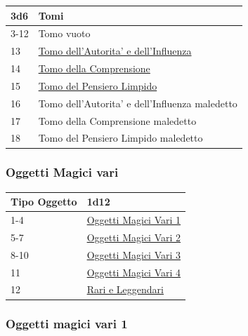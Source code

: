\begin{multicols}{2}
{\medskip\hypertarget{Tomi}{}

{\small\begin{tabularx}{\linewidth}{ll}
		\toprule
\textbf{3d6} & \textbf{Tomi}\\
\toprule
3-12 & Tomo vuoto\\
13 & \hyperlink{Tomo dell'Autorita' e dell'Influenza}{Tomo dell'Autorita' e dell'Influenza}\\
14 & \hyperlink{Tomo della Comprensione}{Tomo della Comprensione}\\
15 & \hyperlink{Tomo del Pensiero Limpido}{Tomo del Pensiero Limpido}\\
16 & Tomo dell'Autorita' e dell'Influenza maledetto\\
17 & Tomo della Comprensione maledetto\\
18 & Tomo del Pensiero Limpido maledetto
\end{tabularx}}

\subsubsection{Oggetti Magici vari}\hypertarget{oggettimagicivari}{}\label{oggettimagicivari}

{\small\begin{tabularx}{\linewidth}{ll}
		\toprule
\textbf{Tipo Oggetto} & \textbf{1d12}\\
\toprule
1-4 & \hyperlink{Oggetti Magici Vari 1}{Oggetti Magici Vari 1}\\
5-7 & \hyperlink{Oggetti Magici Vari 2}{Oggetti Magici Vari 2}\\
8-10&\hyperlink{Oggetti Magici Vari 3}{Oggetti Magici Vari 3}\\
11  &\hyperlink{Oggetti Magici Vari 4}{Oggetti Magici Vari 4}\\
12  &\hyperlink{Rari e Leggendari}{Rari e Leggendari}
\end{tabularx}}

\subsubsection{Oggetti magici vari 1}\hypertarget{Oggetti Magici Vari 1}{}

}
\end{multicols}

